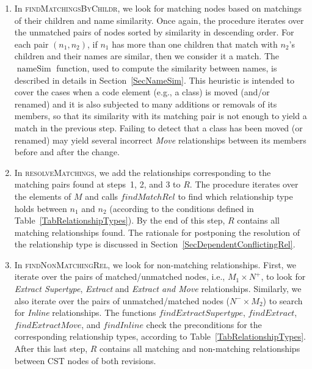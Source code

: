 \documentclass[10pt,journal,compsoc]{IEEEtran}
\DeclareMathOperator{\rdnsim}{nameSim}
\begin{document}
\begin{enumerate}
\item In \textsc{findMatchingsByChildr}, we look for matching nodes based on matchings of their children and name similarity. 
Once again, the procedure iterates over the unmatched pairs of nodes sorted by similarity in descending order.
For each pair $(n_1, n_2)$, if $n_1$ has more than one children that match with $n_2$'s children and their names are similar, then we consider it a match. The $\rdnsim$ function, used to compute the similarity between names, is described in details in Section~\ref{SecNameSim}.
This heuristic is intended to cover the cases when a code element (e.g., a class) is moved (and/or renamed) and it is also subjected to many additions or removals of its members, so that its similarity with its matching pair is not enough to yield a match in the previous step.
Failing to detect that a class has been moved (or renamed) may yield several incorrect \textit{Move} relationships between its members before and after the change.


\item In \textsc{resolveMatchings}, we add the relationships corresponding to the matching pairs found at steps~1, 2, and 3 to $R$.
The procedure iterates over the elements of $M$ and calls $\mathit{findMatchRel}$ to find which relationship type holds between $n_1$ and $n_2$ (according to the conditions defined in Table~\ref{TabRelationshipTypes}).
By the end of this step, $R$ contains all matching relationships found.
The rationale for postponing the resolution of the relationship type is discussed in Section~\ref{SecDependentConflictingRel}.

\item In \textsc{findNonMatchingRel}, we look for non-matching relationships.
First, we iterate over the pairs of matched/unmatched nodes, i.e., $M_1 \times N^+$, to look for \textit{Extract Supertype}, \textit{Extract} and \textit{Extract and Move} relationships.
Similarly, we also iterate over the pairs of unmatched/matched nodes ($N^- \times M_2$) to search for \textit{Inline} relationships.
The functions $findExtractSupertype$, $findExtract$, $findExtractMove$, and $findInline$ check the  preconditions for the corresponding relationship types, according to Table~\ref{TabRelationshipTypes}.
After this last step, $R$ contains all matching and non-matching relationships between CST nodes of both revisions.
\end{enumerate}
\end{document}
